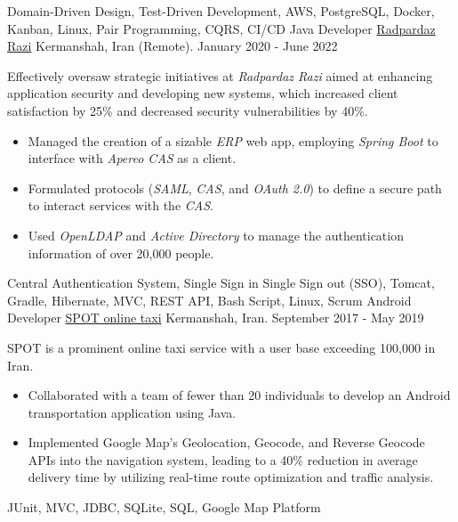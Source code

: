 \begin{experiences}
{\begin{itemize}
   \end{itemize}}{Domain-Driven Design, Test-Driven Development, AWS, PostgreSQL, Docker, Kanban, Linux, Pair Programming, CQRS, CI/CD}
  \emptySeparator 
\experience
{}
{Java Developer}
{\href{https://raadpardaz.ir/}{Radpardaz Razi}}
{Kermanshah, Iran {\scriptsize{(Remote)}}. \hspace{150 pt} January 2020 - June 2022}
{}
{
\par{Effectively oversaw strategic initiatives at \emph{Radpardaz Razi} aimed at enhancing application security and developing new systems, which increased client satisfaction by 25\% and decreased security vulnerabilities by 40\%.}
\begin{itemize}
\item Managed the creation of a sizable \emph{ERP} web app, employing \emph{Spring Boot} to interface with \emph{Apereo CAS} as a client.
\item Formulated protocols (\emph{SAML}, \emph{CAS}, and \emph{OAuth 2.0}) to define a secure path to interact services with the \textit{CAS}.
\item Used \emph{OpenLDAP} and \emph{Active Directory} to manage the authentication information of over 20,000 people.
\end{itemize}
}{Central Authentication System, Single Sign in Single Sign out (SSO), Tomcat, Gradle, Hibernate, MVC, REST API, Bash Script, Linux, Scrum}
\emptySeparator
\experience
  {}
  {Android Developer}
  {\href{https://www.spotbar.ir/}{SPOT online taxi}}
  {Kermanshah, Iran. \hspace{140 pt} September 2017 - May 2019}
  {}
  {
  SPOT is a prominent online taxi service with a user base exceeding 100,000 in Iran. 
  \begin{itemize}
    \item Collaborated with a team of fewer than 20 individuals to develop an Android transportation application using Java.
    \item Implemented Google Map's Geolocation, Geocode, and Reverse Geocode APIs into the navigation system, leading to a 40\% reduction in average delivery time by utilizing real-time route optimization and traffic analysis. \end{itemize}
  }{JUnit, MVC, JDBC, SQLite, SQL, Google Map Platform}

\emptySeparator


\end{experiences}
